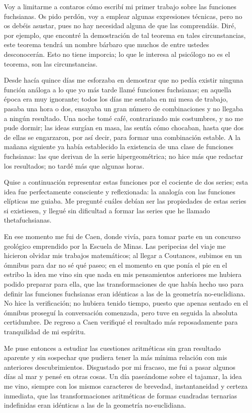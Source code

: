 \documentclass[a4paper, 12pt, draft]{article}
\begin{document}
Voy a limitarme a contaros cómo escribí mi primer trabajo sobre las
funciones fuchsianas. Os pido perdón, voy a emplear algunas expresiones técnicas, pero no os debéis asustar, pues no hay necesidad alguna de
que las comprendáis. Diré, por ejemplo, que encontré la
demostración de tal teorema en tales circunstancias, este teorema tendrá un nombre bárbaro que muchos de entre ustedes desconocerán.
Esto no tiene imporcia; lo que le interesa al psicólogo no es el
teorema, son las circunstancias.


Desde hacía quince días me esforzaba en demostrar que no pedía existir ninguna función análoga a lo que yo más tarde llamé
funciones fuchsianas; en aquella época era muy ignorante; todos los días me sentaba en mi mesa de trabajo, pasaba una hora o dos, ensayaba
un gran número de combinaciones y no llegaba a ningún resultado. Una
noche tomé café, contrariando mis costumbres, y no me pude dormir;
las ideas surgían en masa, las sentía cómo chocaban, hasta que
dos de ellas se engarzaron, por así decir, para formar una combinación estable. A la mañana siguiente ya había establecido la
existencia de una clase de funciones fuchsianas: las que derivan de la serie
hipergeométrica; no hice más que redactar los resultados; no tardé más que algunas horas.

Quise a continuación representar estas funciones por el cociente de dos
series; esta idea fue perfectamente consciente y reflexionada: la analogía con las funciones elípticas me guiaba. Me pregunté cuáles debían ser las propiedades de estas series si existiesen, y llegué sin dificultad a formar las series que he llamado thetafuchsianas.

En ese momento me fui de Caen, donde vivía, para tomar parte en un
concurso geológico emprendido por la Escuela de Minas. Las peripecias
del viaje me hicieron olvidar mis trabajos matemáticos; al llegar a
Coutances, subimos en un ómnibus para dar no sé qué paseo;
en el momento en que ponía el pie en el estribo la idea me vino sin que
nada en mis pensamientos anteriores me hubiera podido preparar para
ella, que las transformaciones de que había hecho uso para definir 
las funciones fuchsianas eran idénticas a las de la geometría 
no-euclidiana. No hice la verificación; no hubiera tenido tiempo,
puesto que apenas sentado en el ómnibus proseguí la conversación comenzada, pero tuve en seguida la absoluta certidumbre. De regreso a Caen
verifiqué el resultado más reposadamente para tranquilidad de mi espíritu.

Me puse entonces a estudiar las cuestiones aritméticas sin gran
resultado aparente y sin sospechar que pudiera tener la más mínima
relación con mis anteriores descubrimientos. Disgustado por mi fracaso,
me fui a pasar algunos días al mar y pensé en otras cosas. Un día paseándome sobre el tajamar, la idea me vino, siempre con los mismos caracteres de brevedad, instantaneidad y certeza inmediata, que las transformaciones aritméticas de formas cuadradas ternarias indefinidas eran idénticas a las de
la geometría no-euclidiana.
\end{document}
